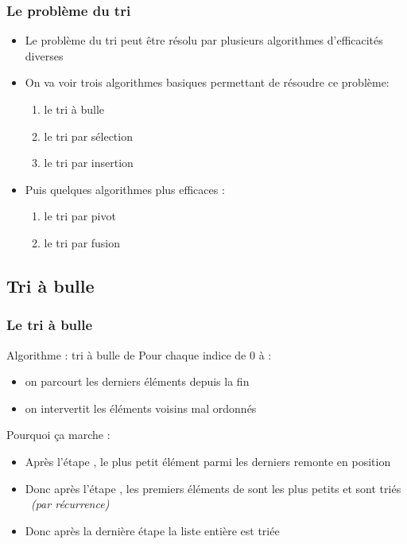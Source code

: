 \documentclass[12pt]{linfo-beamer}
\begin{document}

\begin{frame}
  \frametitle{Le problème du tri}
  \begin{itemize}
  \item Le problème du tri peut être résolu par plusieurs algorithmes
  d'efficacités diverses
  \item On va voir trois algorithmes basiques permettant de résoudre ce
    problème:
    \begin{enumerate}
    \item le tri à bulle
    \item le tri par sélection
    \item le tri par insertion
    \end{enumerate}
  \item Puis quelques algorithmes plus efficaces :
    \begin{enumerate}
    \item le tri par pivot
    \item le tri par fusion
    \end{enumerate}
  \end{itemize}
\end{frame}


\subsection{Tri à bulle}
\label{sub:tri_à_bulle}

\begin{frame}
\frametitle{Le tri à bulle}
  \begin{beamerboxesrounded}{Algorithme : tri à bulle de }
  Pour chaque indice  de 0 à  :
    \begin{itemize}
      \item on parcourt les  derniers éléments depuis la fin
      \item on intervertit les éléments voisins mal ordonnés
    \end{itemize}
  \end{beamerboxesrounded}

    \vfill

  Pourquoi ça marche :
  \begin{itemize}
  \item Après l'étape , le plus petit élément parmi les
     derniers remonte en position 
  \item Donc après l'étape , les  premiers
    éléments de  sont les plus petits et sont triés
    \emph{\small \color{gray} (par récurrence)}
  \item Donc après la dernière étape la liste entière est triée
  \end{itemize}

\end{frame}
\end{document}
